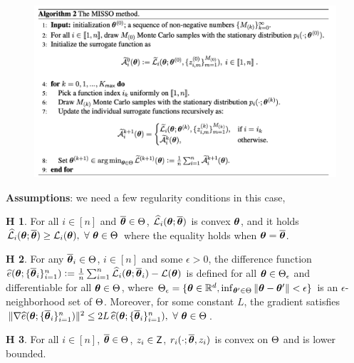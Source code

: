 \documentclass[a0,landscape]{a0poster}
\theoremstyle{definition}
\newtheorem{assumption}{H\!\!}
\begin{document}
\begin{multicols}{3}
\begin{tcolorbox}[colback=white!5!white,colframe=blue!75!black,fonttitle=\sffamily\bfseries\large,title=An Inctractability for Latent Data Models]
\vspace{.1cm}
\end{tcolorbox}


\begin{tcolorbox}[colback=white!5!white,colframe=blue!75!black,fonttitle=\sffamily\bfseries\large,title=MISSO Method]
\begin{figure}[H]
\centering
        \includegraphics[width=1.\textwidth]{fig/missoalgo}
\end{figure}
\end{tcolorbox}


\begin{tcolorbox}[colback=white!5!white,colframe=red!75!black,fonttitle=\sffamily\bfseries\large,title=Global Convergence Analysis]
\textbf{Assumptions}: we need a few regularity conditions in this case,
\begin{assumption} \label{ass:sur} For all $i \in [n]$ and $\overline{{\bm{\theta}}} \in \Theta$, $\widehat{\cal L}_{i}({\bm{\theta}};\overline{{\bm{\theta}}})$ is convex \wrt ${\bm{\theta}}$, and it holds
$\widehat{\cal L}_{i}({\bm{\theta}};\overline{{\bm{\theta}}}) \geq {\cal L}_i( {\bm{\theta}} ),~\forall~{\bm{\theta}} \in \Theta$ where the equality holds when ${\bm{\theta}} = \overline{{\bm{\theta}}}$.
\end{assumption}
\begin{assumption} \label{ass:diff}
For any $\overline{{\bm{\theta}}}_i \in \Theta$, $i \in [n]$ and some $\epsilon > 0$, the difference function $\widehat{e}({\bm{\theta}} ; \{ \overline{{\bm{\theta}}}_i \}_{i=1}^n ) \mathrel{\mathop:}= \frac{1}{n} \sum_{i=1}^n \widehat{\cal L}_{i}({\bm{\theta}};\overline{{\bm{\theta}}}_i ) - {\cal L}( {\bm{\theta}})$ is defined for all ${\bm{\theta}} \in \Theta_\epsilon$ and differentiable for all ${\bm{\theta}} \in \Theta$, where $\Theta_\epsilon = \{ {\bm{\theta}} \in \mathbb{R}^d, \inf_{{\bm{\theta}}' \in \Theta} \| {\bm{\theta}} - {\bm{\theta}}' \| < \epsilon \}$ is an $\epsilon$-neighborhood set of $\Theta$. Moreover, for some constant $L$, the gradient satisfies $\| {\nabla} \widehat{e}({\bm{\theta}}; \{ \overline{{\bm{\theta}}}_i \}_{i=1}^n)  \|^2 \leq 2 L\!~ \widehat{e}({\bm{\theta}}; \{ \overline{{\bm{\theta}}}_i \}_{i=1}^n) ,~\forall~{\bm{\theta}} \in \Theta$.
\end{assumption}
\begin{assumption} \label{ass:lips}
For all $i \in [n]$, $\overline{{\bm{\theta}}} \in \Theta$, $z_i \in \mathsf{Z}$, $r_{i}(\cdot;\overline{{\bm{\theta}}},z_i)$ is convex on $\Theta$ and is lower bounded.
\end{assumption}\vspace{-0.1in}


\end{tcolorbox}
\end{multicols}
\end{document}
